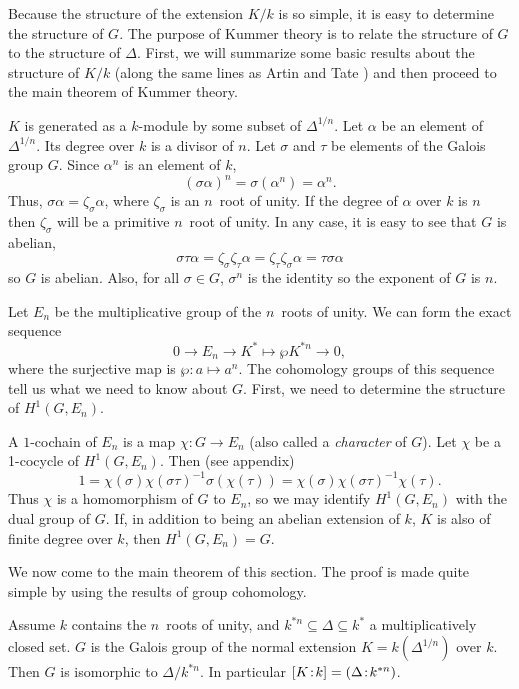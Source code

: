 Because the structure of the extension $K/k$ is so simple, it is easy to
determine the structure of $G$.  The purpose of Kummer theory is to relate
the structure of $G$ to the structure of $\Delta$.  First, we will
summarize some basic results about the structure of $K/k$ (along the same
lines as Artin and Tate \cite{Artin:Tate}) and then proceed to the main
theorem of Kummer theory.

$K$ is generated as a $k$-module by some subset of $\Delta^{1/n}$.  Let
$\alpha$ be an element of $\Delta^{1/n}$.  Its degree over $k$ is a divisor
of $n$.  Let $\sigma$ and $\tau$ be elements of the Galois group $G$.
Since $\alpha^n$ is an element of $k$,
\[
(\sigma\alpha)^n = \sigma(\alpha^n) = \alpha^n.
\]
Thus, $\sigma\alpha = \zeta_{\sigma} \alpha$, where $\zeta_{\sigma}$ is an
$n$\th\ root of unity.  If the degree of $\alpha$ over $k$ is $n$ then
$\zeta_{\sigma}$ will be a primitive $n$\th\ root of unity.  In any case,
it is easy to see that $G$ is abelian,
\[
\sigma\tau\alpha = \zeta_{\sigma} \zeta_{\tau} \alpha = 
\zeta_{\tau} \zeta_{\sigma} \alpha = \tau \sigma \alpha
\]
so $G$ is abelian.  Also, for all $\sigma \in G$,
$\sigma^n$ is the identity so the exponent of $G$ is $n$. 

Let $E_n$ be the multiplicative group of the $n$\th\ roots of unity.  We
can form the exact sequence
\[
0 \longrightarrow E_n \longrightarrow K^\ast \mapsto{\wp}
K^{\ast n} \longrightarrow 0,
\]
where the surjective map is $\wp : a \mapsto a^n$.  The cohomology groups
of this sequence tell us what we need to know about $G$.  First, we need to
determine the structure of $H^1(G, E_n)$.

A $1$-cochain of $E_n$ is a map $\chi : G \rightarrow E_n$ (also called a
{\em character} of $G$).  Let $\chi$ be a 1-cocycle of $H^1(G, E_n)$.  Then
(see appendix)
\[
1 = \chi(\sigma) \chi(\sigma \tau)^{-1} \sigma(\chi(\tau))
= \chi(\sigma) \chi(\sigma \tau)^{-1} \chi(\tau).
\]
Thus $\chi$ is a homomorphism of $G$ to $E_n$, so we may identify $H^1(G,
E_n)$ with the dual group of $G$.  If, in addition to being an abelian
extension of $k$, $K$ is also of finite degree over $k$, then $H^1(G, E_n)
= G$.

\medskip
We now come to the main theorem of this section.  The proof is made
quite simple by using the results of group cohomology.

\begin{proposition}
\label{Kummer:Radical:Prop}
Assume $k$ contains the $n$\th\ roots of unity, and $k^{\ast n}
\subseteq \Delta \subseteq k^{\ast}$ a multiplicatively closed set.
$G$ is the Galois group of the normal extension $K = k(\Delta^{1/n})$
over $k$.  Then $G$ is isomorphic to $\Delta/k^{\ast n}$.  In
particular $[K\!:\!k] = (\Delta\!:\!k^{\ast n})$.
\end{proposition}

